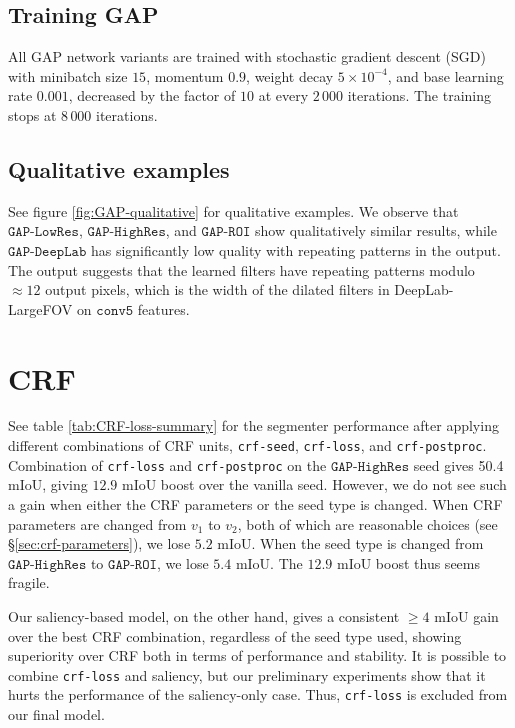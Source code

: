 \documentclass[british,10pt,twocolumn,letterpaper]{article}
\begin{document}
\subsection{\label{sec:supp-gap-train}Training GAP}

All GAP network variants are trained with stochastic gradient descent
(SGD) with minibatch size $15$, momentum $0.9$, weight decay $5\times10^{-4}$,
and base learning rate $0.001$, decreased by the factor of $10$
at every $2\,000$ iterations. The training stops at $8\,000$ iterations.

\subsection{\label{sec:supp-gap-qual}Qualitative examples}

See figure \ref{fig:GAP-qualitative} for qualitative examples. We
observe that $\mathtt{GAP}\text{-}\mathtt{LowRes}$, $\mathtt{GAP}\text{-}\mathtt{HighRes}$,
and $\mathtt{GAP}\text{-}\mathtt{ROI}$ show qualitatively similar
results, while $\mathtt{GAP}\text{-}\mathtt{DeepLab}$ has significantly
low quality with repeating patterns in the output. The output suggests
that the learned filters have repeating patterns modulo $\approx12$
output pixels, which is the width of the dilated filters in DeepLab-LargeFOV
\cite{Chen2016ArxivDeeplabv2} on $\mathtt{conv5}$ features.

\section{\label{sec:supp-crf}CRF}

See table \ref{tab:CRF-loss-summary} for the segmenter performance
after applying different combinations of CRF units, \texttt{crf-seed},
\texttt{crf-loss}, and \texttt{crf-postproc}. Combination of \texttt{crf-loss}
and \texttt{crf-postproc} on the $\mathtt{GAP}\text{-}\mathtt{HighRes}$
seed gives 50.4 mIoU, giving $12.9$ mIoU boost over the vanilla seed.
However, we do not see such a gain when either the CRF parameters
or the seed type is changed. When CRF parameters are changed from
$v_{1}$ to $v_{2}$, both of which are reasonable choices (see \S\ref{sec:crf-parameters}),
we lose $5.2$ mIoU. When the seed type is changed from $\mathtt{GAP}\text{-}\mathtt{HighRes}$
to $\mathtt{GAP}\text{-}\mathtt{ROI}$, we lose $5.4$ mIoU. The $12.9$
mIoU boost thus seems fragile.

Our saliency-based model, on the other hand, gives a consistent $\geq4$
mIoU gain over the best CRF combination, regardless of the seed type
used, showing superiority over CRF both in terms of performance and
stability. It is possible to combine \texttt{crf-loss} and saliency,
but our preliminary experiments show that it hurts the performance
of the saliency-only case. Thus, \texttt{crf-loss} is excluded from
our final model.
\end{document}

